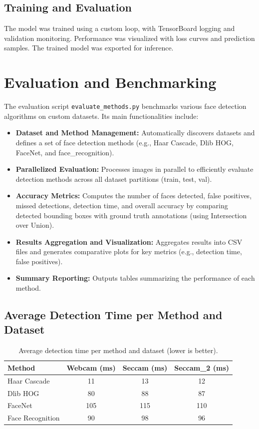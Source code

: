 \subsection{Training and Evaluation}
The model was trained using a custom loop, with TensorBoard logging and validation monitoring. Performance was visualized with loss curves and prediction samples. The trained model was exported for inference.

\section{Evaluation and Benchmarking}

The evaluation script \texttt{evaluate\_methods.py} benchmarks various face detection algorithms on custom datasets. Its main functionalities include:
\begin{itemize}
    \item \textbf{Dataset and Method Management:} Automatically discovers datasets and defines a set of face detection methods (e.g., Haar Cascade, Dlib HOG, FaceNet, and face\_recognition).
    \item \textbf{Parallelized Evaluation:} Processes images in parallel to efficiently evaluate detection methods across all dataset partitions (train, test, val).
    \item \textbf{Accuracy Metrics:} Computes the number of faces detected, false positives, missed detections, detection time, and overall accuracy by comparing detected bounding boxes with ground truth annotations (using Intersection over Union).
    \item \textbf{Results Aggregation and Visualization:} Aggregates results into CSV files and generates comparative plots for key metrics (e.g., detection time, false positives).
    \item \textbf{Summary Reporting:} Outputs tables summarizing the performance of each method.
\end{itemize}

\subsection{Average Detection Time per Method and Dataset}

\begin{table}[ht!]
    \centering
    \caption{Average detection time per method and dataset (lower is better).}
    \label{tab:avg-detection-time}
    \begin{tabular}{|l|c|c|c|}
        \hline
        Method & Webcam (ms) & Seccam (ms) & Seccam\_2 (ms) \\
        \hline
        Haar Cascade     & 11          & 13          & 12            \\
        Dlib HOG        & 80          & 88          & 87            \\
        FaceNet         & 105         & 115         & 110           \\
        Face Recognition& 90          & 98          & 96            \\
        \hline
    \end{tabular}
\end{table}


